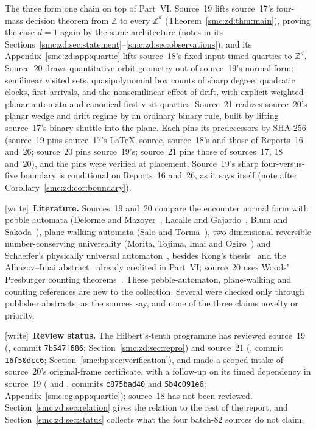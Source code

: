 \documentclass[11pt,letterpaper]{article}
\numberwithin{equation}{section}
\theoremstyle{definition}
\theoremstyle{remark}
\newcommand{\Z}{\mathbb Z}
\newcommand{\wtag}{\textup{[write]}}
\begin{document}
The three form one chain on top of Part~VI. Source~19 lifts source~17's four-mass decision theorem from $\Z$ to every $\Z^d$ (Theorem~\ref{smc:zd:thm:main}), proving the case $d=1$ again by the same architecture (notes in its Sections~\ref{smc:zd:sec:statement}--\ref{smc:zd:sec:observations}), and its Appendix~\ref{smc:zd:app:quartic} lifts source~18's fixed-input timed quartics to $\Z^d$. Source~20 draws quantitative orbit geometry out of source~19's normal form: semilinear visited sets, quasipolynomial box counts of sharp degree, quadratic clocks, first arrivals, and the nonsemilinear effect of drift, with explicit weighted planar automata and canonical first-visit quartics. Source~21 realizes source~20's planar wedge and drift regime by an ordinary binary rule, built by lifting source~17's binary shuttle into the plane. Each pins its predecessors by SHA-256 (source~19 pins source~17's \LaTeX\ source, source~18's and those of Reports~16 and~26; source~20 pins source~19's; source~21 pins those of sources~17, 18 and~20), and the pins were verified at placement. Source~19's sharp four-versus-five boundary is conditional on Reports~16 and~26, as it says itself (note after Corollary~\ref{smc:zd:cor:boundary}).

\wtag\ \textbf{Literature.} Sources~19 and~20 compare the encounter normal form with pebble automata (Delorme and Mazoyer~\cite{delorme2002}, Lacalle and Gajardo~\cite{lacalle2014}, Blum and Sakoda~\cite{blum1977}), plane-walking automata (Salo and T\"orm\"a~\cite{salo2014}), two-dimensional reversible number-conserving universality (Morita, Tojima, Imai and Ogiro~\cite{morita2002}) and Schaeffer's physically universal automaton~\cite{schaeffer2014}, besides Kong's thesis~\cite{kongthesis} and the Alhazov--Imai abstract~\cite{alhazovimai} already credited in Part~VI; source~20 uses Woods' Presburger counting theorems~\cite{woods2015}. These pebble-automaton, plane-walking and counting references are new to the collection. Several were checked only through publisher abstracts, as the sources say, and none of the three claims novelty or priority.

\wtag\ \textbf{Review status.} The Hilbert's-tenth programme has reviewed source~19 (, commit \texttt{7b547f686}; Section~\ref{smc:zd:sec:repro}) and source~21 (, commit \texttt{16f50dcc6}; Section~\ref{smc:bp:sec:verification}), and made a scoped intake of source~20's original-frame certificate, with a follow-up on its timed dependency in source~19 ( and , commits \texttt{c875bad40} and \texttt{5b4c091e6}; Appendix~\ref{smc:og:app:quartic}); source~18 has not been reviewed. Section~\ref{smc:zd:sec:relation} gives the relation to the rest of the report, and Section~\ref{smc:zd:sec:status} collects what the four batch-82 sources do not claim.
\end{document}
